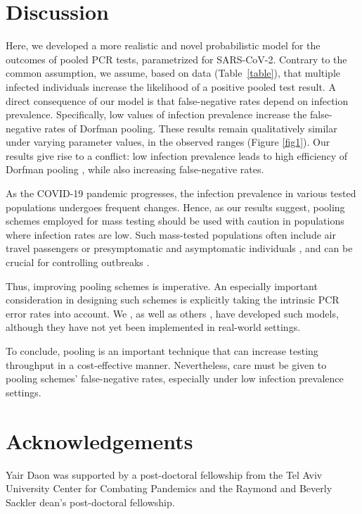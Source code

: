 \documentclass{article}
\begin{document}
\section*{Discussion}
Here, we developed a more realistic and novel probabilistic model for the outcomes of
pooled PCR tests, parametrized for SARS-CoV-2. Contrary to the common
assumption, we assume, based on data (Table~\ref{table}), that multiple
infected individuals increase the likelihood of a positive pooled test
result. A direct consequence of our model is that false-negative rates
depend on infection prevalence. Specifically, low values of infection
prevalence increase the false-negative rates of Dorfman pooling. These results remain qualitatively
similar under varying parameter values, in the observed ranges
\cite{KitComparison,EstimatingRatesKucrika, EstimatingRatesLourenco,
  InterpretingCOVID19Test} (Figure \ref{fig1}).
Our results give rise to a conflict: low infection prevalence leads to high
efficiency of Dorfman pooling \cite{DorfmanYuvalDor}, while also
increasing false-negative rates. 

As the COVID-19 pandemic progresses, the infection prevalence
in various tested populations undergoes frequent changes. Hence, as
our results suggest, pooling schemes employed for mass testing should be
used with caution in populations where infection rates are low. Such
mass-tested populations often include air travel passengers
\cite{JTM} or presymptomatic and asymptomatic individuals \cite{RobinHood}, and can be crucial for
controlling outbreaks \cite{MinaScience}.

Thus, improving pooling schemes is imperative. An especially important
consideration in designing such schemes is explicitly taking the
intrinsic PCR error rates into account. We \cite{DOPE}, as well as
others \cite{BayesianDorfman}, have developed such models, although
they have not yet been implemented in real-world settings.

To conclude, pooling is an important technique that can increase
testing throughput in a cost-effective manner. Nevertheless, care must
be given to pooling schemes' false-negative rates, especially under
low infection prevalence settings.

\section*{Acknowledgements}
Yair Daon was supported by a post-doctoral fellowship from the Tel Aviv University Center for Combating Pandemics and the Raymond and Beverly Sackler dean's
post-doctoral fellowship.



\end{document}
